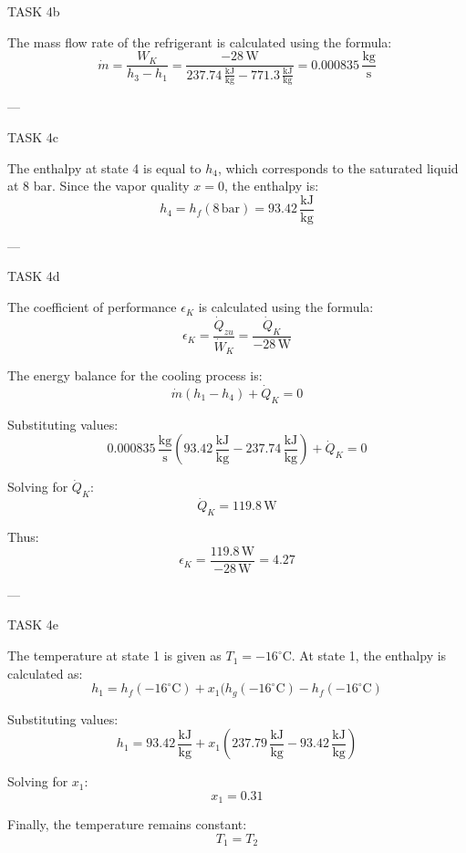 TASK 4b

The mass flow rate of the refrigerant is calculated using the formula:
\[
\dot{m} = \frac{W_K}{h_3 - h_1} = \frac{-28 \, \text{W}}{237.74 \, \frac{\text{kJ}}{\text{kg}} - 771.3 \, \frac{\text{kJ}}{\text{kg}}} = 0.000835 \, \frac{\text{kg}}{\text{s}}
\]

---

TASK 4c

The enthalpy at state 4 is equal to \( h_4 \), which corresponds to the saturated liquid at 8 bar. Since the vapor quality \( x = 0 \), the enthalpy is:
\[
h_4 = h_f(8 \, \text{bar}) = 93.42 \, \frac{\text{kJ}}{\text{kg}}
\]

---

TASK 4d

The coefficient of performance \( \epsilon_K \) is calculated using the formula:
\[
\epsilon_K = \frac{\dot{Q}_{zu}}{\dot{W}_K} = \frac{\dot{Q}_K}{-28 \, \text{W}}
\]

The energy balance for the cooling process is:
\[
\dot{m}(h_1 - h_4) + \dot{Q}_K = 0
\]

Substituting values:
\[
0.000835 \, \frac{\text{kg}}{\text{s}} \left( 93.42 \, \frac{\text{kJ}}{\text{kg}} - 237.74 \, \frac{\text{kJ}}{\text{kg}} \right) + \dot{Q}_K = 0
\]

Solving for \( \dot{Q}_K \):
\[
\dot{Q}_K = 119.8 \, \text{W}
\]

Thus:
\[
\epsilon_K = \frac{119.8 \, \text{W}}{-28 \, \text{W}} = 4.27
\]

---

TASK 4e

The temperature at state 1 is given as \( T_1 = -16^\circ\text{C} \). At state 1, the enthalpy is calculated as:
\[
h_1 = h_f(-16^\circ\text{C}) + x_1(h_g(-16^\circ\text{C}) - h_f(-16^\circ\text{C})
\]

Substituting values:
\[
h_1 = 93.42 \, \frac{\text{kJ}}{\text{kg}} + x_1(237.79 \, \frac{\text{kJ}}{\text{kg}} - 93.42 \, \frac{\text{kJ}}{\text{kg}})
\]

Solving for \( x_1 \):
\[
x_1 = 0.31
\]

Finally, the temperature remains constant:
\[
T_1 = T_2
\]